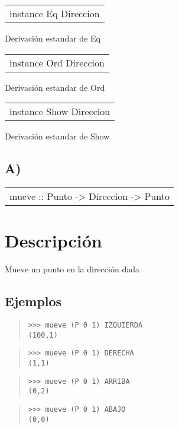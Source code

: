 \begin{haddockdesc}
\item[\begin{tabular}{@{}l}
instance Eq Direccion
\end{tabular}]
{\haddockbegindoc
Derivación estandar de Eq\par}
\end{haddockdesc}
\begin{haddockdesc}
\item[\begin{tabular}{@{}l}
instance Ord Direccion
\end{tabular}]
{\haddockbegindoc
Derivación estandar de Ord\par}
\end{haddockdesc}
\begin{haddockdesc}
\item[\begin{tabular}{@{}l}
instance Show Direccion
\end{tabular}]
{\haddockbegindoc
Derivación estandar de Show\par}
\end{haddockdesc}
\subsection{A)}
\begin{haddockdesc}
\item[\begin{tabular}{@{}l}
mueve :: Punto -> Direccion -> Punto
\end{tabular}]
{\haddockbegindoc
\section*{Descripción}
Mueve un punto en la dirección dada\par
\subsection*{Ejemplos}
\begin{quote}
{\haddockverb\begin{verbatim}
>>> mueve (P 0 1) IZQUIERDA
(100,1)

\end{verbatim}}
\end{quote}
\begin{quote}
{\haddockverb\begin{verbatim}
>>> mueve (P 0 1) DERECHA
(1,1)

\end{verbatim}}
\end{quote}
\begin{quote}
{\haddockverb\begin{verbatim}
>>> mueve (P 0 1) ARRIBA
(0,2)

\end{verbatim}}
\end{quote}
\begin{quote}
{\haddockverb\begin{verbatim}
>>> mueve (P 0 1) ABAJO
(0,0)

\end{verbatim}}
\end{quote}}
\end{haddockdesc}
